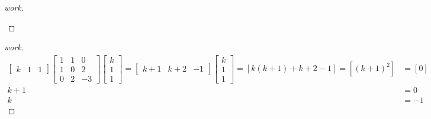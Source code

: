 \documentclass{article}
\begin{document}
\begin{enumerate}
{\begin{enumerate}
\begin{proof}[work]
\begin{enumerate}
                \end{enumerate}
            \end{proof}
        \end{enumerate}
    }
    \begin{proof}[work]
        \begin{align*}
            \begin{bmatrix}
                k & 1 & 1
            \end{bmatrix}
            \begin{bmatrix}
                1 & 1 & 0  \\
                1 & 0 & 2  \\
                0 & 2 & -3
            \end{bmatrix}
            \begin{bmatrix}
                k \\ 1 \\ 1
            \end{bmatrix} =
            \begin{bmatrix}
                k+1 & k+2 & -1
            \end{bmatrix}
            \begin{bmatrix}
                k \\ 1 \\ 1
            \end{bmatrix} =
            \left[k(k + 1) + k + 2 - 1\right] = \left[(k+1)^2\right] & = \left[0\right] \\
            k + 1                                                    & = 0              \\
            k                                                        & = -1
        \end{align*}
    \end{proof}
\end{enumerate}
\end{document}

